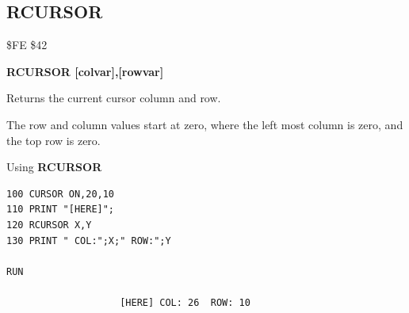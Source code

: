 \subsection{RCURSOR}
\begin{description}[leftmargin=2cm,style=nextline]
\item [Token:] \$FE \$42
\item [Format:] {\bf RCURSOR [colvar],[rowvar]}
\item [Usage:]  Returns the current cursor column and row.

\item [Remarks:] The row and column values start at zero, where
                 the left most column is zero, and the top row is zero.

\item [Example:] Using {\bf RCURSOR}

\begin{tcolorbox}[colback=black,coltext=white]
\verbatimfont{\codefont}
\begin{verbatim}
100 CURSOR ON,20,10
110 PRINT "[HERE]";
120 RCURSOR X,Y
130 PRINT " COL:";X;" ROW:";Y

RUN

                    [HERE] COL: 26  ROW: 10
\end{verbatim}
\end{tcolorbox}
\end{description}


\newpage
